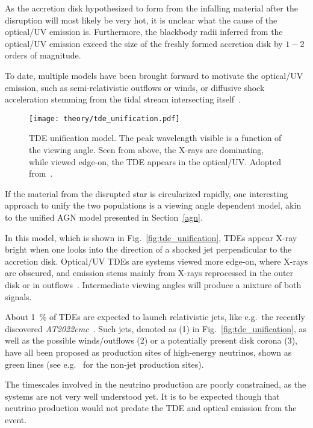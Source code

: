 As the accretion disk hypothesized  to form from the infalling material after the disruption will most likely be very hot, it is unclear what the cause of the optical/UV emission is. Furthermore, the blackbody radii inferred from the optical/UV emission exceed the size of the freshly formed accretion disk by $1-2$ orders of magnitude.

To date, multiple models have been brought forward to motivate the optical/UV emission, such as semi-relativistic outflows or winds, or diffusive shock acceleration stemming from the tidal stream intersecting itself~\cite{Gezari2021}.

\begin{figure}[htbp]
  \texttt{[image: theory/tde\_unification.pdf]}
  \caption[TDE Unification]{TDE unification model. The peak wavelength visible is a function of the viewing angle. Seen from above, the X-rays are dominating, while viewed edge-on, the TDE appears in the optical/UV\@. Adopted from~\cite{Hayasaki2021}.}
\end{figure}

If the material from the disrupted star is circularized rapidly, one interesting approach to unify the two populations is a viewing angle dependent model, akin to the unified AGN model presented in Section~\ref{agn}.

In this model, which is shown in Fig.~\ref{fig:tde_unification}, TDEs appear X-ray bright when one looks into the direction of a shocked jet perpendicular to the accretion disk. Optical/UV TDEs are systems viewed more edge-on, where X-rays are obscured, and emission stems mainly from X-rays reprocessed in the outer disk or in outflows~. Intermediate viewing angles will produce a mixture of both signals.

About \SI{1}{\percent} of TDEs are expected to launch relativistic jets, like e.g.\ the recently discovered \textit{AT2022cmc}~. Such jets, denoted as (1) in Fig.~\ref{fig:tde_unification}, as well as the possible winds/outflows (2) or a potentially present disk corona (3), have all been proposed as production sites of high-energy neutrinos, shown as green lines (see e.g.~ for the non-jet production sites).

The timescales involved in the neutrino production are poorly constrained, as the systems are not very well understood yet. It is to be expected though that neutrino production would not predate the TDE and optical emission from the event.

